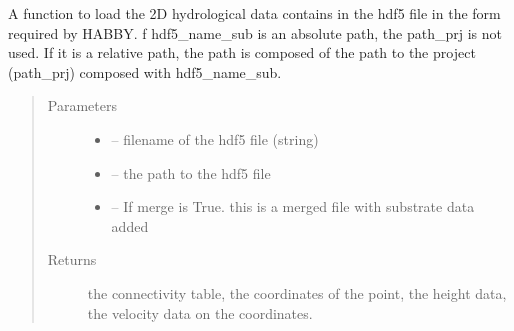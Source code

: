 \documentclass[letterpaper,10pt,english]{sphinxmanual}
\begin{document}
\begin{fulllineitems}
\label{\detokenize{index:src.load_hdf5.load_hdf5_hyd}}
A function to load the 2D hydrological data contains in the hdf5 file in the form required by HABBY. f hdf5\_name\_sub
is an absolute path, the path\_prj is not used. If it is a relative path, the path is composed of the path to the
project (path\_prj) composed with hdf5\_name\_sub.
\begin{quote}\begin{description}
\item[{Parameters}] \leavevmode\begin{itemize}
\item {} 
 -- filename of the hdf5 file (string)

\item {} 
 -- the path to the hdf5 file

\item {} 
 -- If merge is True. this is a merged file with substrate data added

\end{itemize}

\item[{Returns}] \leavevmode
the connectivity table, the coordinates of the point, the height data, the velocity data on the coordinates.

\end{description}\end{quote}

\end{fulllineitems}

\end{document}
